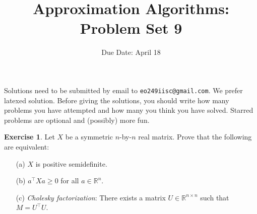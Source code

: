 \documentclass[11pt]{article}
\theoremstyle{definition}
\newtheorem{exercise}{Exercise}
\newcommand{\R}{\mathbb{R}}
\begin{document}
\title{{\bf Approximation Algorithms: Problem Set 9}}
\date{Due Date: April 18}
\maketitle
{\small 
Solutions need to be submitted by email to \texttt{eo249iisc@gmail.com}. We prefer latexed solution. 
Before giving the solutions, you should write how many problems you have attempted and how many you think you have solved.
Starred problems are optional and (possibly) more fun.
}
\vspace{1ex}
\def\poly{\mathrm{poly}}
\def\Exp{\mathbf{Exp}}
\def\Pr{\mathbf{Pr}}

\begin{exercise}
Let $X$ be a symmetric $n$-by-$n$ real matrix. Prove that the following are equivalent:
\begin{enumerate}
\item[(a)]
$X$ is positive semidefinite.
\item[(b)]
$a^\top X a \geq 0$ for all $a \in \R^n$.
\item[(c)]
{\em Cholesky factorization}: There exists a matrix $U \in \R^{n \times n}$ such that $M = U^\top U$.
\end{enumerate}
\end{exercise}
\end{document}
